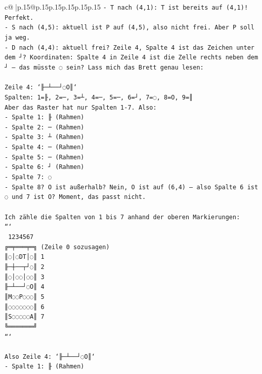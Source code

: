 \documentclass{article}
\begin{document}
{\begin{supertabular}{c@{$\;$}|p{.15\linewidth}@{}p{.15\linewidth}p{.15\linewidth}p{.15\linewidth}p{.15\linewidth}p{.15\linewidth}}
{{{\texttt{{-} T nach (4,1): T ist bereits auf (4,1)! Perfekt.} \\
\texttt{{-} S nach (4,5): aktuell ist P auf (4,5), also nicht frei. Aber P soll ja weg.} \\
\texttt{{-} D nach (4,4): aktuell frei? Zeile 4, Spalte 4 ist das Zeichen unter dem ┘? Koordinaten: Spalte 4 in Zeile 4 ist die Zelle rechts neben dem ┘ – das müsste ◌ sein? Lass mich das Brett genau lesen:} \\
\\ 
\texttt{Zeile 4: `╟─┴──┘◌O║`} \\
\texttt{Spalten: 1=╟, 2=─, 3=┴, 4=─, 5=─, 6=┘, 7=◌, 8=O, 9=║} \\
\texttt{Aber das Raster hat nur Spalten 1{-}7. Also:} \\
\texttt{{-} Spalte 1: ╟ (Rahmen)} \\
\texttt{{-} Spalte 2: ─ (Rahmen)} \\
\texttt{{-} Spalte 3: ┴ (Rahmen)} \\
\texttt{{-} Spalte 4: ─ (Rahmen)} \\
\texttt{{-} Spalte 5: ─ (Rahmen)} \\
\texttt{{-} Spalte 6: ┘ (Rahmen)} \\
\texttt{{-} Spalte 7: ◌} \\
\texttt{{-} Spalte 8? O ist außerhalb? Nein, O ist auf (6,4) – also Spalte 6 ist ◌ und 7 ist O? Moment, das passt nicht.} \\
\\ 
\texttt{Ich zähle die Spalten von 1 bis 7 anhand der oberen Markierungen:} \\
\texttt{```} \\
\texttt{ 1234567} \\
\texttt{╔═╤═══╤═╗  (Zeile 0 sozusagen)} \\
\texttt{║◌│◌DT│◌║ 1} \\
\texttt{╟─┼──┬┘◌║ 2} \\
\texttt{║◌│◌◌│◌◌║ 3} \\
\texttt{╟─┴──┘◌O║ 4} \\
\texttt{║M◌◌P◌◌◌║ 5} \\
\texttt{║◌◌◌◌◌◌◌║ 6} \\
\texttt{║S◌◌◌◌◌A║ 7} \\
\texttt{╚═══════╝} \\
\texttt{```} \\
\\ 
\texttt{Also Zeile 4: `╟─┴──┘◌O║`} \\
\texttt{{-} Spalte 1: ╟ (Rahmen)} \\
}}}
\end{supertabular}}
\end{document}
